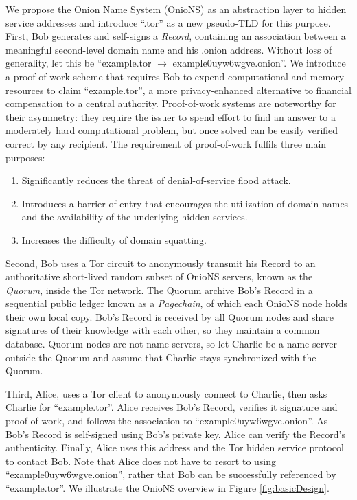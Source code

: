 \documentclass{sig-alternate}
\begin{document}
We propose the Onion Name System (OnioNS) as an abstraction layer to hidden service addresses and introduce ``.tor'' as a new pseudo-TLD for this purpose. First, Bob generates and self-signs a \emph{Record}, containing an association between a meaningful second-level domain name and his .onion address. Without loss of generality, let this be ``example.tor $ \rightarrow $ example0uyw6wgve.onion''. We introduce a proof-of-work scheme that requires Bob to expend computational and memory resources to claim ``example.tor'', a more privacy-enhanced alternative to financial compensation to a central authority. Proof-of-work systems are noteworthy for their asymmetry: they require the issuer to spend effort to find an answer to a moderately hard computational problem, but once solved can be easily verified correct by any recipient. The requirement of proof-of-work fulfils three main purposes:

\begin{enumerate}
	\item Significantly reduces the threat of denial-of-service flood attack.
	\item Introduces a barrier-of-entry that encourages the utilization of domain names and the availability of the underlying hidden services.
	\item Increases the difficulty of domain squatting.
\end{enumerate}

Second, Bob uses a Tor circuit to anonymously transmit his Record to an authoritative short-lived random subset of OnioNS servers, known as the \emph{Quorum}, inside the Tor network. The Quorum archive Bob's Record in a sequential public ledger known as a \emph{Pagechain}, of which each OnioNS node holds their own local copy. Bob's Record is received by all Quorum nodes and share signatures of their knowledge with each other, so they maintain a common database. Quorum nodes are not name servers, so let Charlie be a name server outside the Quorum and assume that Charlie stays synchronized with the Quorum.

Third, Alice, uses a Tor client to anonymously connect to Charlie, then asks Charlie for ``example.tor''. Alice receives Bob's Record, verifies it signature and proof-of-work, and follows the association to ``example0uyw6wgve.onion''. As Bob's Record is self-signed using Bob's private key, Alice can verify the Record's authenticity. Finally, Alice uses this address and the Tor hidden service protocol to contact Bob. Note that Alice does not have to resort to using ``example0uyw6wgve.onion'', rather that Bob can be successfully referenced by ``example.tor''. We illustrate the OnioNS overview in Figure \ref{fig:basicDesign}.
\end{document}
